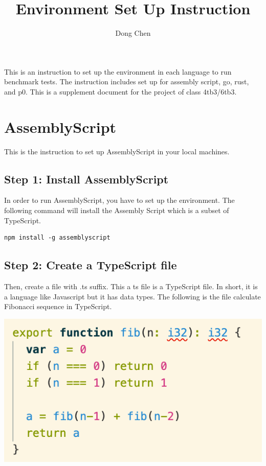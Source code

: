 \documentclass[12pt]{article}
\title{Environment Set Up Instruction}
\author{Dong Chen}
\begin{document}
\maketitle

This is an instruction to set up the environment in each language to run benchmark tests. The instruction includes set up for 
assembly script, go, rust, and p0. This is a supplement document for the project of class 4tb3/6tb3.

\section{AssemblyScript}
This is the instruction to set up AssemblyScript in your local machines.
\subsection{Step 1: Install AssemblyScript}
In order to run AssemblyScript, you have to set up the environment. The following command will install the Assembly Script 
which is a subset of TypeScript.
~\newline
\begin{verbatim}
npm install -g assemblyscript
\end{verbatim}

\subsection{Step 2: Create a TypeScript file}
Then, create a file with .ts suffix. This a ts file is a TypeScript file. In short, it is a language like Javascript but 
it has data types. The following is the file calculate Fibonacci sequence in TypeScript.
~\newline

\includegraphics[scale = 0.6]{img/ts-fib}
\end{document}
